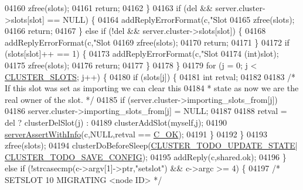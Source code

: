 \begin{DoxyCode}
{{{{{{{{{{{{{{{{{{{{{{{{{{{{{{{{{{{{{{{{{{{{{{{{{{{{{{{{{{{{{{{{{{{{{{{{{{04160                 zfree(slots);
04161                 \textcolor{keywordflow}{return};
04162             \}
04163             \textcolor{keywordflow}{if} (del && server.cluster->slots[slot] == NULL) \{
04164                 addReplyErrorFormat(c,\textcolor{stringliteral}{"Slot %
04165                 zfree(slots);
04166                 \textcolor{keywordflow}{return};
04167             \} \textcolor{keywordflow}{else} \textcolor{keywordflow}{if} (!del && server.cluster->slots[slot]) \{
04168                 addReplyErrorFormat(c,\textcolor{stringliteral}{"Slot %
04169                 zfree(slots);
04170                 \textcolor{keywordflow}{return};
04171             \}
04172             \textcolor{keywordflow}{if} (slots[slot]++ == 1) \{
04173                 addReplyErrorFormat(c,\textcolor{stringliteral}{"Slot %
04174                     (\textcolor{keywordtype}{int})slot);
04175                 zfree(slots);
04176                 \textcolor{keywordflow}{return};
04177             \}
04178         \}
04179         \textcolor{keywordflow}{for} (j = 0; j < \hyperlink{cluster_8h_aa3e2cb951eebb16725ecc3f5beefd9fd}{CLUSTER\_SLOTS}; j++) \{
04180             \textcolor{keywordflow}{if} (slots[j]) \{
04181                 \textcolor{keywordtype}{int} retval;
04182 
04183                 \textcolor{comment}{/* If this slot was set as importing we can clear this}
04184 \textcolor{comment}{                 * state as now we are the real owner of the slot. */}
04185                 \textcolor{keywordflow}{if} (server.cluster->importing\_slots\_from[j])
04186                     server.cluster->importing\_slots\_from[j] = NULL;
04187 
04188                 retval = del ? clusterDelSlot(j) :
04189                                clusterAddSlot(myself,j);
04190                 \hyperlink{server_8h_a7308f76cbff9a8d3797fe78190b91282}{serverAssertWithInfo}(c,NULL,retval == 
      \hyperlink{server_8h_a303769ef1065076e68731584e758d3e1}{C\_OK});
04191             \}
04192         \}
04193         zfree(slots);
04194         clusterDoBeforeSleep(\hyperlink{cluster_8h_abea0d393cba342261e4a7e6fb745f388}{CLUSTER\_TODO\_UPDATE\_STATE}|
      \hyperlink{cluster_8h_a0ae5ff08fbae3c655012b4de8bfc327d}{CLUSTER\_TODO\_SAVE\_CONFIG});
04195         addReply(c,shared.ok);
04196     \} \textcolor{keywordflow}{else} \textcolor{keywordflow}{if} (!strcasecmp(c->argv[1]->ptr,\textcolor{stringliteral}{"setslot"}) && c->argc >= 4) \{
04197         \textcolor{comment}{/* SETSLOT 10 MIGRATING <node ID> */}
}}}}}}}}}}}}}}}}}}}}}}}}}}}}}}}}}}}}}}}}}}}}}}}}}}}}}}}}}}}}}}}}}}}}}}}}}}}}}
\end{DoxyCode}
